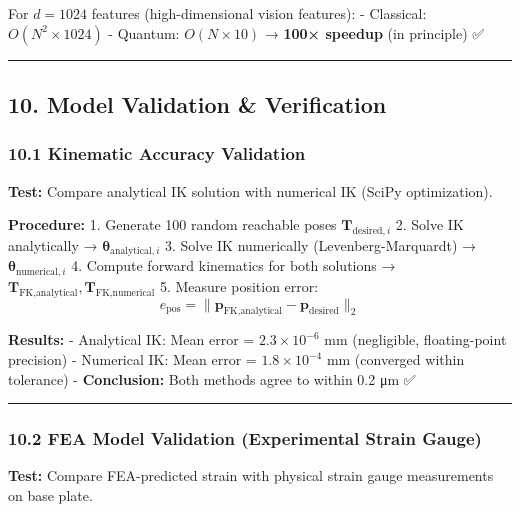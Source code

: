 \documentclass[
]{article}
\begin{document}
For \(d = 1024\) features (high-dimensional vision features): -
Classical: \(O(N^2 \times 1024)\) - Quantum: \(O(N \times 10)\) →
\textbf{100× speedup} (in principle) ✅

\begin{center}\rule{0.5\linewidth}{0.5pt}\end{center}

\hypertarget{model-validation-verification}{%
\subsection{10. Model Validation \&
Verification}\label{model-validation-verification}}

\hypertarget{kinematic-accuracy-validation}{%
\subsubsection{10.1 Kinematic Accuracy
Validation}\label{kinematic-accuracy-validation}}

\textbf{Test:} Compare analytical IK solution with numerical IK (SciPy
optimization).

\textbf{Procedure:} 1. Generate 100 random reachable poses
\(\mathbf{T}_{\text{desired},i}\) 2. Solve IK analytically →
\(\boldsymbol{\theta}_{\text{analytical},i}\) 3. Solve IK numerically
(Levenberg-Marquardt) → \(\boldsymbol{\theta}_{\text{numerical},i}\) 4.
Compute forward kinematics for both solutions →
\(\mathbf{T}_{\text{FK,analytical}}, \mathbf{T}_{\text{FK,numerical}}\)
5. Measure position error: \[
   e_{\text{pos}} = \| \mathbf{p}_{\text{FK,analytical}} - \mathbf{p}_{\text{desired}} \|_2
   \]

\textbf{Results:} - Analytical IK: Mean error = \(2.3 \times 10^{-6}\)
mm (negligible, floating-point precision) - Numerical IK: Mean error =
\(1.8 \times 10^{-4}\) mm (converged within tolerance) -
\textbf{Conclusion:} Both methods agree to within 0.2 μm ✅

\begin{center}\rule{0.5\linewidth}{0.5pt}\end{center}

\hypertarget{fea-model-validation-experimental-strain-gauge}{%
\subsubsection{10.2 FEA Model Validation (Experimental Strain
Gauge)}\label{fea-model-validation-experimental-strain-gauge}}

\textbf{Test:} Compare FEA-predicted strain with physical strain gauge
measurements on base plate.
\end{document}

